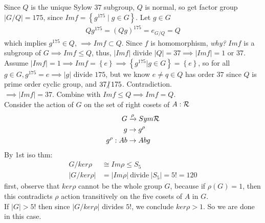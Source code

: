 \documentclass{article}
\begin{document}
\begin{homeworkProblem}
    Since $Q$ is the unique Sylow $37$ subgroup, $Q$ is normal, 
    so get factor group $\lvert G/Q\rvert = 175$,
    since $Im f = \left\{ g^{175} \mid g \in G \right\}$.
    Let $g \in G$ 
    \begin{align}
        Qg^{175} = (Qg)^{175} = e_{G/Q} = Q
    \end{align}
    which implies $g^{175} \in Q$,
    $\implies Im f \subset Q$.
    Since $f$ is homomorphism, \textit{why?}
    $Im f$ is a subgroup of $G \implies Im f \leq Q$, 
    thus, $\lvert Im f\rvert$ divide $\lvert Q \rvert = 37 \implies \lvert Im f\rvert = 1$ or $37$.\\
    Assume $\lvert Im f\rvert = 1 \implies Im f = \left\{ e\right\} \implies \left\{ g^{175} | g \in G\right\} = \left\{ e \right\}$,
    so for all $g \in G, g^{175} = e \implies \lvert g \rvert$ divide $175$, but 
    we know $e \neq q \in Q$ has order $37$ since $Q$ is 
    prime order cyclic group, and $37 \hspace{-4pt}\not| \hspace{2pt} 175$. 
    Contradiction.\\
    $\implies \lvert Im f\rvert = 37$. Combine
    with $Im f \leq Q \implies Im f = Q$.\\


    Consider the action of $G$ on the set of right cosets of $A: \mathcal R$
    \begin{align}
        G &\xrightarrow[]{\rho} Sym \mathcal R\\
        g &\rightarrow g^{\rho}\\
        g^{\rho}: Ab &\rightarrow Abg
    \end{align}
    By 1st iso thm:
    \begin{align}
        G/ ker \rho &\cong Im \rho \leq S_5\\
        \lvert G / ker \rho \rvert &= \lvert Im \rho \rvert \ \text{divide} \ \lvert S_5\rvert = 5! = 120
    \end{align}
    first, observe that $ker \rho$ cannot be the whole group $G$, because if 
    $\rho (G) = 1$,
    then this contradicts $\rho$ action transitively on the five cosets 
    of $A$ in $G$. \\
    If $\lvert G \rvert > 5!$ then since $\lvert G / ker \rho \rvert$ divides $5!$,
    we conclude $ker \rho > 1$. So we are done in this case.\\


\end{homeworkProblem}
\end{document}
